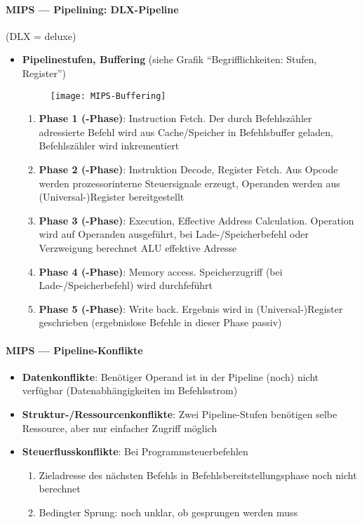 \paragraph{MIPS --- Pipelining: DLX-Pipeline} (DLX = deluxe)
\begin{itemize}
  \item \textbf{Pipelinestufen, Buffering} (siehe Grafik "`Begrifflichkeiten: Stufen, Register"')
  \begin{figure}[H]\centering\label{MIPS-Buffering}\texttt{[image: MIPS-Buffering]}\end{figure}
  \begin{enumerate}
    \item \textbf{Phase 1 (-Phase)}: Instruction Fetch. Der durch Befehlszähler adressierte Befehl wird aus Cache/Speicher in Befehlsbuffer geladen, Befehlszähler wird inkrementiert
    \item \textbf{Phase 2 (-Phase)}: Instruktion Decode, Register Fetch. Aus Opcode werden prozessorinterne Steuersignale erzeugt, Operanden werden aus (Universal-)Register bereitgestellt
    \item \textbf{Phase 3 (-Phase)}: Execution, Effective Address Calculation. Operation wird auf Operanden ausgeführt, bei Lade-/Speicherbefehl oder Verzweigung berechnet ALU effektive Adresse
    \item \textbf{Phase 4 (-Phase)}: Memory access. Speicherzugriff (bei Lade-/Speicherbefehl) wird durchfeführt
    \item \textbf{Phase 5 (-Phase)}: Write back. Ergebnis wird in (Universal-)Register geschrieben (ergebnislose Befehle in dieser Phase passiv)
  \end{enumerate}
\end{itemize}

\paragraph{MIPS --- Pipeline-Konflikte}
\begin{itemize}
  \item \textbf{Datenkonflikte}: Benötiger Operand ist in der Pipeline (noch) nicht verfügbar (Datenabhängigkeiten im Befehlsstrom)
  \item \textbf{Struktur-/Ressourcenkonflikte}: Zwei Pipeline-Stufen benötigen selbe Ressource, aber nur einfacher Zugriff möglich
  \item \textbf{Steuerflusskonflikte}: Bei Programmsteuerbefehlen
  \begin{enumerate}
    \item Zieladresse des nächsten Befehls in Befehlsbereitstellungsphase noch nicht berechnet
    \item Bedingter Sprung: noch unklar, ob gesprungen werden muss
  \end{enumerate}
\end{itemize}

